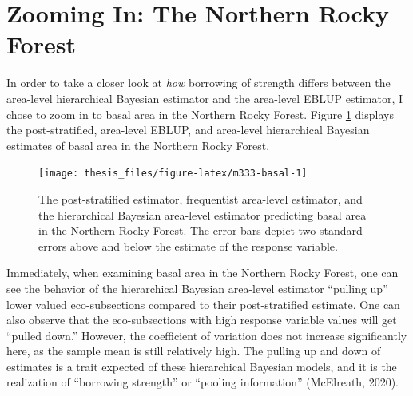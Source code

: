 \documentclass[12pt,twoside]{reedthesis}
\begin{document}
\hypertarget{zooming-in-the-northern-rocky-forest}{%
\section{Zooming In: The Northern Rocky Forest}\label{zooming-in-the-northern-rocky-forest}}

In order to take a closer look at \emph{how} borrowing of strength differs between the area-level hierarchical Bayesian estimator and the area-level EBLUP estimator, I chose to zoom in to basal area in the Northern Rocky Forest. Figure \ref{fig:m333-basal} displays the post-stratified, area-level EBLUP, and area-level hierarchical Bayesian estimates of basal area in the Northern Rocky Forest.
\begin{figure}

{\centering \texttt{[image: thesis\_files/figure-latex/m333-basal-1]} 

}

\caption[Post-stratified, area-level EBLUP, and area-level HB estimates in M333]{The post-stratified estimator, frequentist area-level estimator, and the hierarchical Bayesian area-level estimator predicting basal area in the Northern Rocky Forest. The error bars depict two standard errors above and below the estimate of the response variable.}\label{fig:m333-basal}
\end{figure}
Immediately, when examining basal area in the Northern Rocky Forest, one can see the behavior of the hierarchical Bayesian area-level estimator ``pulling up'' lower valued eco-subsections compared to their post-stratified estimate. One can also observe that the eco-subsections with high response variable values will get ``pulled down.'' However, the coefficient of variation does not increase significantly here, as the sample mean is still relatively high. The pulling up and down of estimates is a trait expected of these hierarchical Bayesian models, and it is the realization of ``borrowing strength'' or ``pooling information'' (McElreath, 2020).
\end{document}
